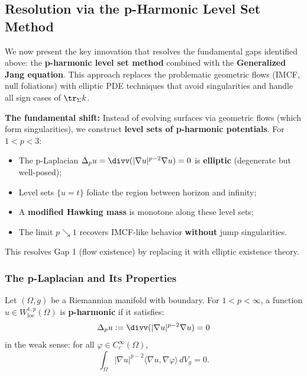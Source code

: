 \subsection{Resolution via the p-Harmonic Level Set Method}\label{subsec:p-harmonic-resolution}

We now present the key innovation that resolves the fundamental gaps identified above: the \textbf{p-harmonic level set method} combined with the \textbf{Generalized Jang equation}. This approach replaces the problematic geometric flows (IMCF, null foliations) with elliptic PDE techniques that avoid singularities and handle all sign cases of $\tr_\Sigma k$.

\begin{remark}
\textbf{The fundamental shift:} Instead of evolving surfaces via geometric flows (which form singularities), we construct \textbf{level sets of p-harmonic potentials}. For $1 < p < 3$:
\begin{itemize}
\item The p-Laplacian $\Delta_p u = \divv(|\nabla u|^{p-2}\nabla u) = 0$ is \textbf{elliptic} (degenerate but well-posed);
\item Level sets $\{u = t\}$ foliate the region between horizon and infinity;
\item A \textbf{modified Hawking mass} is monotone along these level sets;
\item The limit $p \searrow 1$ recovers IMCF-like behavior \textbf{without} jump singularities.
\end{itemize}
This resolves Gap 1 (flow existence) by replacing it with elliptic existence theory.
\end{remark}

\subsubsection{The p-Laplacian and Its Properties}

\begin{definition}\label{def:p-harmonic}
Let $(\Omega, g)$ be a Riemannian manifold with boundary. For $1 < p < \infty$, a function $u \in W^{1,p}_{\mathrm{loc}}(\Omega)$ is \textbf{p-harmonic} if it satisfies:
\begin{equation}\label{eq:p-laplacian}
\Delta_p u := \divv(|\nabla u|^{p-2}\nabla u) = 0
\end{equation}
in the weak sense: for all $\varphi \in C^\infty_c(\Omega)$,
\begin{equation}
\int_\Omega |\nabla u|^{p-2} \langle \nabla u, \nabla \varphi \rangle \, dV_g = 0.
\end{equation}
\end{definition}

